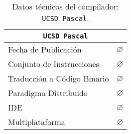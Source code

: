 \begin{table}[h]

\begin{center}

\begin{tabular}{|l|l|}\hline
\multicolumn{2}{|c|}{\texttt{UCSD Pascal}}\\ 
\hline
\hline
Fecha de Publicación & $\varnothing$ \\ \hline
Conjunto de Instrucciones & $\varnothing$ \\ \hline
Traducción a Código Binario & $\varnothing$ \\ \hline
Paradigma Distribuido & $\varnothing$ \\ \hline
IDE & $\varnothing$ \\ \hline
Multiplataforma & $\varnothing$ \\ \hline
\end{tabular}

\caption{Datos técnicos del compilador: \texttt{UCSD Pascal}.}

\end{center}

\end{table}